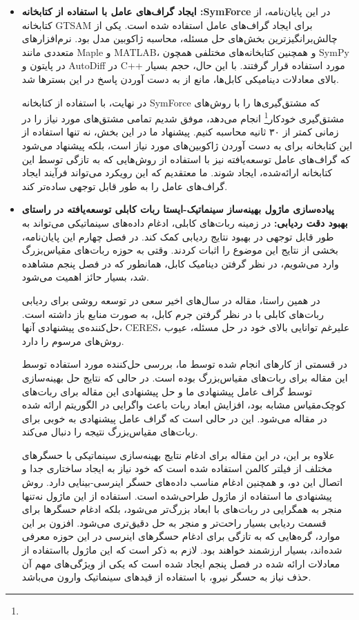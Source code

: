 \begin{itemize}
	
\item {\textbf{ایجاد گراف‌های عامل با استفاده از کتابخانه :SymForce} 
در این پایان‌نامه، از کتابخانه GTSAM برای ایجاد گراف‌های عامل استفاده شده است. یکی از چالش‌برانگیزترین بخش‌های حل مسئله، محاسبه ژاکوبین مدل بود. نرم‌افزارهای متعددی مانند Maple و MATLAB، و همچنین کتابخانه‌های مختلفی همچون SymPy در پایتون و AutoDiff در C++ مورد استفاده قرار گرفتند. با این حال، حجم بسیار بالای معادلات دینامیکی کابل‌ها، مانع از به دست آوردن پاسخ در این بسترها شد. 

در نهایت، با استفاده از کتابخانه SymForce که مشتق‌گیری‌ها را با روش‌های مشتق‌گیری خودکار\footnote{} 
 انجام می‌دهد، موفق شدیم تمامی مشتق‌های مورد نیاز را در زمانی کمتر از ۳۰ ثانیه محاسبه کنیم. 
پیشنهاد ما در این بخش، نه تنها استفاده از این کتابخانه برای به دست آوردن ژاکوبین‌های مورد نیاز است، بلکه پیشنهاد می‌شود که گراف‌های عامل توسعه‌یافته نیز با استفاده از روش‌هایی که به تازگی توسط این کتابخانه ارائه‌شده، ایجاد شوند. ما معتقدیم که این رویکرد می‌تواند فرآیند ایجاد گراف‌های عامل را به طور قابل توجهی ساده‌تر کند.}



\item \textbf{پیاده‌سازی ماژول بهینه‌ساز سینماتیک-ایستا ربات کابلی توسعه‌یافته در راستای بهبود دقت ردیابی:} 
در زمینه ربات‌های کابلی، ادغام داده‌های سینماتیکی می‌تواند به طور قابل توجهی در بهبود نتایج ردیابی کمک کند. در فصل چهارم این پایان‌نامه، بخشی از نتایج این موضوع را اثبات کردند. وقتی به حوزه ربات‌های مقیاس‌بزرگ وارد می‌شویم، در نظر گرفتن دینامیک کابل، همانطور که در فصل پنجم مشاهده شد، بسیار حائز اهمیت می‌شود. 

در همین راستا، مقاله \cite{allak2022kinematics} در سال‌های اخیر سعی در توسعه روشی برای ردیابی ربات‌های کابلی با در نظر گرفتن جرم کابل، به صورت منابع باز داشته است. حل‌کننده‌ی پیشنهادی آنها، CERES، علیرغم توانایی بالای خود در حل مسئله، عیوب روش‌های مرسوم را دارد. 

در قسمتی از کارهای انجام شده توسط ما، بررسی حل‌کننده مورد استفاده توسط این مقاله برای ربات‌های مقیاس‌بزرگ بوده است. در حالی که نتایج حل بهینه‌سازی توسط گراف عامل پیشنهادی ما و حل پیشنهادی این مقاله برای ربات‌های کوچک‌مقیاس مشابه بود، افزایش ابعاد ربات باعث واگرایی در الگوریتم ارائه شده در مقاله می‌شود. این در حالی است که گراف عامل پیشنهادی به خوبی برای ربات‌های مقیاس‌بزرگ نتیجه را دنبال می‌کند.

علاوه بر این، در این مقاله برای ادغام نتایج بهینه‌سازی سینماتیکی با حسگر‌های مختلف از فیلتر کالمن استفاده شده است که خود نیاز به ایجاد ساختاری جدا و اتصال این دو، و همچنین ادغام مناسب داده‌های حسگر اینرسی-بینایی دارد. روش پیشنهادی ما استفاده از ماژول طراحی‌شده است. استفاده از این ماژول نه‌تنها منجر به همگرایی در ربات‌های با ابعاد بزرگ‌تر می‌شود، بلکه ادغام حسگرها برای قسمت ردیابی بسیار راحت‌تر و منجر به حل دقیق‌تری می‌شود. افزون بر این موارد، گره‌هایی که به تازگی برای ادغام حسگرهای اینرسی در این حوزه معرفی شده‌اند، بسیار ارزشمند خواهند بود. لازم به ذکر است که این ماژول بااستفاده از معادلات ارائه شده در فصل پنجم ایجاد شده است که یکی از ویژگی‌های مهم آن حذف نیاز به حسگر نیروِ، با استفاده از قید‌های سینماتیک وارون می‌باشد. 


\end{itemize}
